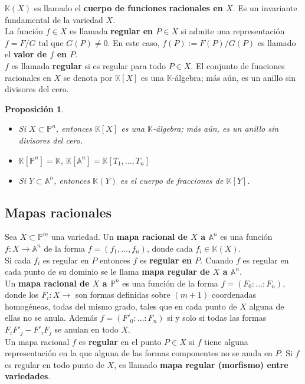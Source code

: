 \documentclass[12pt,a4paper]{report}
\newcommand{\ea}{\mathbb{A}^{n}}
\newcommand{\ep}{\mathbb{P}^{n}}
\newcommand{\K}{\mathbb{K}}
\newtheorem{prop}{Proposición}[chapter]
\begin{document}
$\K(X)$ es llamado el \textbf{cuerpo de funciones racionales en $X$}. Es un invariante fundamental de la variedad $X$. \\

La función $f\in X$ es llamada \textbf{regular en $P \in X$} si admite una representación $f=F/G$ tal que $G(P)\neq 0$. En este caso, $f(P):=F(P)/G(P)$ es llamado el \textbf{valor de $f$ en $P$}.\\
$f$ es llamada \textbf{regular} si es regular para todo $P \in X$. El conjunto de funciones racionales en $X $  se denota por $\K[X]$ es una $\K$-álgebra; más aún, es un anillo sin divisores del cero. \\

\begin{prop}
	\begin{itemize}
		\item Si $X \subset \ep$, entonces $\K[X]$ es una $\K$-álgebra; más aún, es un anillo sin divisores del cero.
		\item $\K[\ep]= \K$, $\K[\ea]= \K[T_{1},\ldots, T_{n}] $
		\item Si $Y \subset \ea$, entonces $\K(Y)$ es el cuerpo de fracciones de $\K[Y]$.
	\end{itemize}
\end{prop}


\subsection{Mapas racionales}
Sea $X \subset \mathbb{P}^{m}$ una variedad. Un \textbf{mapa racional de $X$ a $\ea$} es una función $f:X \rightarrow \ea$ de la forma $f=(f_{1},\ldots , f_{n})$, donde cada $f_{i}\in \K(X)$. \\
Si cada $f_{i}$ es regular en $P$ entonces $f$ es \textbf{regular en $P$}. Cuando $f$ es regular en cada punto de su dominio se le llama \textbf{mapa regular de $X$ a $\ea$}.\\

Un \textbf{mapa racional de $X$ a $\ep$} es una función de la forma $f=(F_{0}:\ldots : F_{n})$, donde los $F_{i}:X \rightarrow $ son formas definidas sobre $(m+1)$ coordenadas homogéneas, todas del mismo grado, tales que en cada punto de $X$ alguna de ellas no se anula. Además $f=(F'_{0} : \ldots :F_{n} )$ si y solo si todas las formas $F_{i}F'_{j} - F'_{i}F_{j}$ se anulan en todo $X$.\\
Un mapa racional $f$ es \textbf{regular} en el punto $P\in X$ si $f$ tiene alguna representación en la que alguna de las formas componentes no se anula en $P$. Si $f$ es regular en todo punto de $X$, es llamado \textbf{mapa regular (morfismo) entre variedades}. \\
\end{document}
